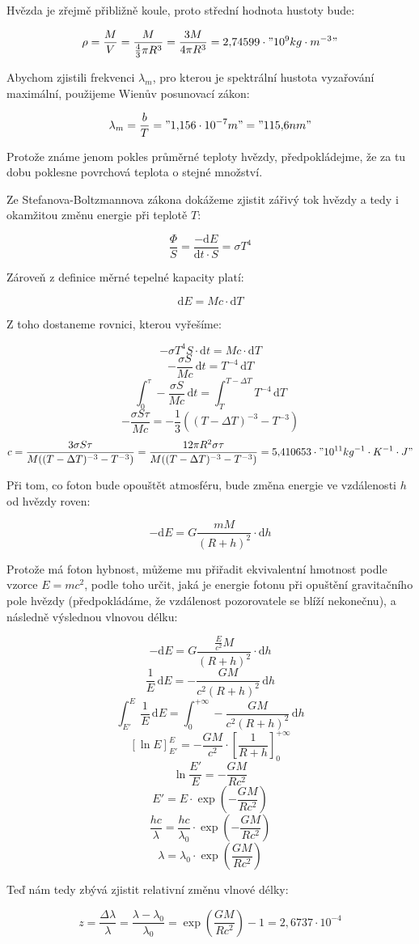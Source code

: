 \documentclass{fkssolpub}
\author{Ondřej Sedláček}
\newcommand{\dd}{\mathrm{d}}
\begin{document}
Hvězda je zřejmě přibližně koule, proto střední hodnota hustoty bude:

\[
	\rho = \frac{M}{V} = \frac{M}{\frac{4}{3} \pi R^3} = \frac{3M}{4 \pi R^3} = 2{,}74599 \cdot "10^{9} kg \cdot m^{-3}"
\]

Abychom zjistili frekvenci $\lambda_m$, pro kterou je spektrální hustota vyzařování maximální, použijeme Wienův posunovací zákon:

\[
	\lambda_m = \frac{b}{T} = "1{,}156 \cdot 10^{-7} m" = "115{,}6 nm"
\]

Protože známe jenom pokles průměrné teploty hvězdy, předpokládejme, že za tu dobu poklesne povrchová teplota o stejné množství.

Ze Stefanova-Boltzmannova zákona dokážeme zjistit zářivý tok hvězdy a tedy i okamžitou změnu energie při teplotě $T$:

\[
	\frac{\Phi}{S} = \frac{- \dd E}{\dd t \cdot S} = \sigma T^4
\]

Zároveň z definice měrné tepelné kapacity platí:

\[
	\dd E = M c \cdot \dd T
\]

Z toho dostaneme rovnici, kterou vyřešíme:

\[
	- \sigma T^4 S \cdot \dd t = M c \cdot \dd T
\]
\[
	- \frac{\sigma S}{M c} \, \dd t = T^{-4}  \, \dd T
\]
\[
	\int_0^{\tau } - \frac{\sigma S}{M c} \, \dd t = \int_T^{T - \Delta T} T^{-4}  \, \dd T
\]
\[
	- \frac{\sigma S \tau}{M c} = - \frac{1}{3} ((T - \Delta T)^{-3} - T^{-3})
\]
\[
	c = \frac{3 \sigma S \tau}{M ((T - \Delta T)^{-3} - T^{-3})} = \frac{12 \pi R^2 \sigma \tau}{M ((T - \Delta T)^{-3} - T^{-3})} = 5{,}410653 \cdot "10^{11} kg^{-1} \cdot K^{-1} \cdot J"
\]

Při tom, co foton bude opouštět atmosféru, bude změna energie ve vzdálenosti $h$ od hvězdy roven:

\[
	- \dd E = G \frac{m M}{(R + h)^2} \cdot \dd h
\]

Protože má foton hybnost, můžeme mu přiřadit ekvivalentní hmotnost podle vzorce $E = m c^2$, podle toho určit, jaká je energie fotonu při opuštění gravitačního pole hvězdy (předpokládáme, že vzdálenost pozorovatele se blíží nekonečnu), a následně výslednou vlnovou délku:

\[
	- \dd E = G \frac{\frac{E}{c^2} M}{(R + h)^2} \cdot \dd h
\]
\[
	\frac{1}{E} \, \dd E = - \frac{G M}{c^2 (R + h)^2} \, \dd h
\]
\[
	\int_{E'}^{E} \frac{1}{E} \, \dd E = \int_0^{+\infty} - \frac{G M}{c^2 (R + h)^2} \, \dd h
\]
\[
	[\ln E]_{E'}^{E} = - \frac{GM}{c^2} \cdot \left[\frac{1}{R + h}\right]_0^{+\infty}
\]
\[
	\ln \frac{E'}{E} = - \frac{GM}{R c^2}
\]
\[
	E' = E \cdot \exp\left(-\frac{GM}{R c^2}\right)
\]
\[
	\frac{h c}{\lambda} = \frac{hc}{\lambda_0} \cdot \exp\left(-\frac{GM}{R c^2}\right)
\]
\[
	\lambda = \lambda_0 \cdot \exp\left(\frac{GM}{R c^2}\right)
\]

Teď nám tedy zbývá zjistit relativní změnu vlnové délky:

\[
	z = \frac{\Delta \lambda}{\lambda} = \frac{\lambda - \lambda_0}{\lambda_0} = \exp\left(\frac{GM}{R c^2}\right) - 1 = 2{,}6737 \cdot 10^{-4}
\]
\end{document}
